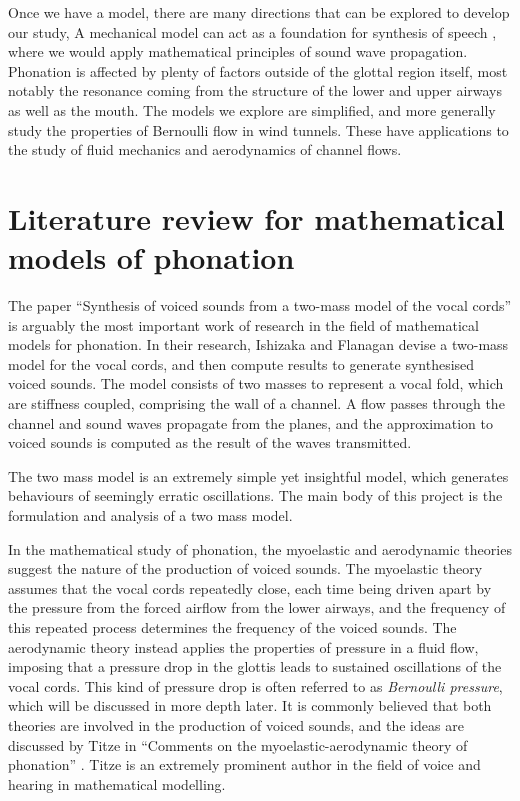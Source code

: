 \documentclass{report}
\begin{document}
Once we have a model,
there are many directions that can be explored to develop our study,
A mechanical model can act as a foundation for synthesis of speech \cite{ishizaka_flanagan_1972},
where we would apply mathematical principles of sound wave propagation.
Phonation is affected by plenty of factors outside of the glottal region itself,
most notably the resonance coming from the structure of the lower and upper airways as well as the mouth.
The models we explore are simplified,
and more generally study the properties of Bernoulli flow in wind tunnels.
These have applications to the study of fluid mechanics and aerodynamics of channel flows.

\section{Literature review for mathematical models of phonation}

The paper ``Synthesis of voiced sounds from a two-mass model of the vocal cords'' \cite[1972]{ishizaka_flanagan_1972} is arguably the most important work of research in the field of mathematical models for phonation.
In their research, Ishizaka and Flanagan devise a two-mass model for the vocal cords, and then compute results to generate synthesised voiced sounds.
The model consists of two masses to represent a vocal fold, which are stiffness coupled, comprising the wall of a channel.
A flow passes through the channel and sound waves propagate from the planes,
and the approximation to voiced sounds is computed as the result of the waves transmitted. %

The two mass model is an extremely simple yet insightful model,
which generates behaviours of seemingly erratic oscillations.
The main body of this project is the formulation and analysis of a two mass model.

In the mathematical study of phonation, the myoelastic and aerodynamic theories suggest the nature of the production of voiced sounds.
The myoelastic theory assumes that the vocal cords repeatedly close,
each time being driven apart by the pressure from the forced airflow from the lower airways,
and the frequency of this repeated process determines the frequency of the voiced sounds.
The aerodynamic theory instead applies the properties of pressure in a fluid flow,
imposing that a pressure drop in the glottis leads to sustained oscillations of the vocal cords.
This kind of pressure drop is often referred to as \textit{Bernoulli pressure}, which will be discussed in more depth later.
It is commonly believed that both theories are involved in the production of voiced sounds,
and the ideas are discussed by Titze in ``Comments on the myoelastic-aerodynamic theory of phonation'' \cite[1980]{titze_1980}.
Titze is an extremely prominent author in the field of voice and hearing in mathematical modelling.
\end{document}
